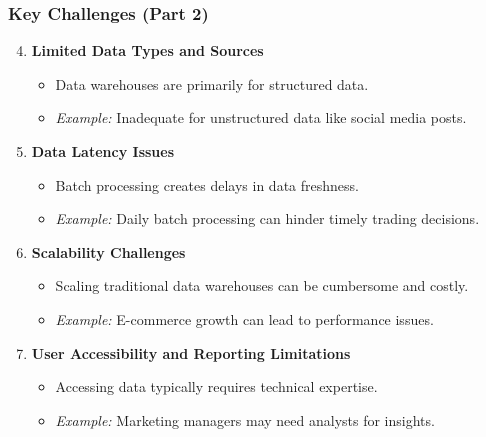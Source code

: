 \documentclass[aspectratio=169]{beamer}
\begin{document}
\begin{frame}[fragile]
    \frametitle{Key Challenges (Part 2)}
    \begin{enumerate}
        \setcounter{enumi}{3} %
        \item \textbf{Limited Data Types and Sources}
        \begin{itemize}
            \item Data warehouses are primarily for structured data.
            \item \textit{Example:} Inadequate for unstructured data like social media posts.
        \end{itemize}
        
        \item \textbf{Data Latency Issues}
        \begin{itemize}
            \item Batch processing creates delays in data freshness.
            \item \textit{Example:} Daily batch processing can hinder timely trading decisions.
        \end{itemize}
        
        \item \textbf{Scalability Challenges}
        \begin{itemize}
            \item Scaling traditional data warehouses can be cumbersome and costly.
            \item \textit{Example:} E-commerce growth can lead to performance issues.
        \end{itemize}
        
        \item \textbf{User Accessibility and Reporting Limitations}
        \begin{itemize}
            \item Accessing data typically requires technical expertise.
            \item \textit{Example:} Marketing managers may need analysts for insights.
        \end{itemize}
    \end{enumerate}
\end{frame}
\end{document}
